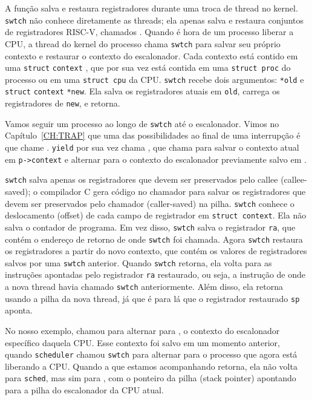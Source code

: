 A função
salva e restaura registradores durante uma troca de thread no kernel.
\lstinline{swtch}
não conhece diretamente as threads; ela apenas salva e
restaura conjuntos de registradores RISC-V, chamados
.
Quando é hora de um processo liberar a CPU,
a thread do kernel do processo chama
\lstinline{swtch}
para salvar seu próprio contexto e restaurar o contexto do escalonador.
Cada contexto está contido em uma
\lstinline{struct}
\lstinline{context}
,
que por sua vez está contida em uma
\lstinline{struct proc}
do processo ou em uma
\lstinline{struct cpu}
da CPU.
\lstinline{swtch}
recebe dois argumentos:
\lstinline{*old}
e
\lstinline{struct}
\lstinline{context}
\lstinline{*new}.
Ela salva os registradores atuais em
\lstinline{old},
carrega os registradores de
\lstinline{new},
e retorna.

Vamos seguir um processo ao longo de
\lstinline{swtch}
até o escalonador.
Vimos no Capítulo~\ref{CH:TRAP}
que uma das possibilidades ao final de uma interrupção é que
chame
.
\lstinline{yield}
por sua vez chama
,
que chama
para salvar o contexto atual em
\lstinline{p->context}
e alternar para o contexto do escalonador previamente salvo em
.

\lstinline{swtch}
salva apenas os registradores que devem ser preservados pelo callee (callee-saved);
o compilador C gera código no chamador para salvar
os registradores que devem ser preservados pelo chamador (caller-saved) na pilha.
\lstinline{swtch} conhece o deslocamento (offset) de cada
campo de registrador em
\lstinline{struct context}.
Ela não salva o contador de programa.
Em vez disso,
\lstinline{swtch}
salva o registrador
\lstinline{ra},
que contém o endereço de retorno de onde
\lstinline{swtch}
foi chamada.
Agora
\lstinline{swtch}
restaura os registradores a partir do novo contexto,
que contém os valores de registradores salvos por uma
\lstinline{swtch}
anterior.
Quando
\lstinline{swtch}
retorna, ela volta para as instruções apontadas pelo registrador
\lstinline{ra}
restaurado, ou seja,
a instrução de onde a nova thread havia chamado
\lstinline{swtch}
anteriormente.
Além disso, ela retorna usando a pilha da nova thread,
já que é para lá que o registrador restaurado
\lstinline{sp}
aponta.

No nosso exemplo,
chamou
para alternar para
,
o contexto do escalonador específico daquela CPU.
Esse contexto foi salvo em um momento anterior, quando
\lstinline{scheduler}
chamou
\lstinline{swtch}
para alternar para o processo que agora está liberando a CPU.
Quando a
que estamos acompanhando retorna,
ela não volta para
\lstinline{sched},
mas sim para
,
com o ponteiro da pilha (stack pointer) apontando para a pilha do escalonador da CPU atual.

